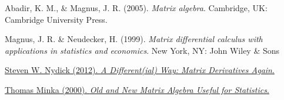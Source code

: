 \documentclass[a4paper,12pt]{article}
\begin{document}
\begin{thebibliography}{1}
 Abadir, K. M., \& Magnus, J. R. (2005). \emph{Matrix algebra}. Cambridge, UK: Cambridge University Press.

 Magnus, J. R. \& Neudecker, H. (1999). \emph{Matrix differential calculus with applications in statistics and economics}. New York, NY: John Wiley \& Sons

 \href{http://www.tc.umn.edu/~nydic001/docs/unpubs/Magnus_Matrix_Differentials_Presentation.pdf}{Steven W. Nydick (2012). \emph{A Different(ial) Way: Matrix Derivatives Again}.}

 \href{http://research.microsoft.com/en-us/um/people/minka/papers/matrix/minka-matrix.pdf}{Thomas Minka (2000). \emph{Old and New Matrix Algebra Useful for Statistics}.}
\end{thebibliography}
\end{document}
